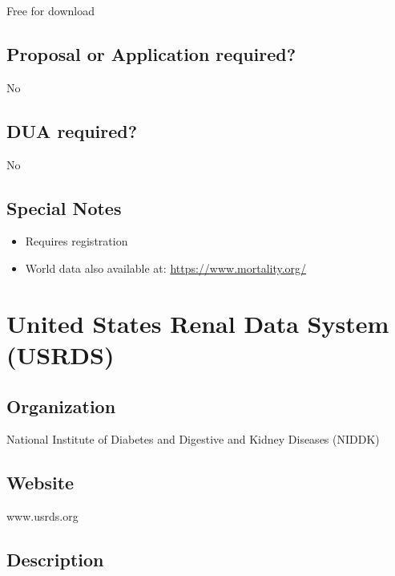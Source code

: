 \documentclass[
]{book}
\providecommand{\tightlist}{%
  \setlength{\itemsep}{0pt}\setlength{\parskip}{0pt}}
\begin{document}
Free for download

\hypertarget{proposal-or-application-required-91}{%
\section{Proposal or Application required?}\label{proposal-or-application-required-91}}

No

\hypertarget{dua-required-91}{%
\section{DUA required?}\label{dua-required-91}}

No

\hypertarget{special-notes-91}{%
\section{Special Notes}\label{special-notes-91}}

\begin{itemize}
\tightlist
\item
  Requires registration
\item
  World data also available at: \url{https://www.mortality.org/}
\end{itemize}

\mainmatter

\hypertarget{united-states-renal-data-system-usrds}{%
\chapter{United States Renal Data System (USRDS)}\label{united-states-renal-data-system-usrds}}

\hypertarget{organization-92}{%
\section{Organization}\label{organization-92}}

National Institute of Diabetes and Digestive and Kidney Diseases (NIDDK)

\hypertarget{website-92}{%
\section{Website}\label{website-92}}

www.usrds.org

\hypertarget{description-92}{%
\section{Description}\label{description-92}}
\end{document}
